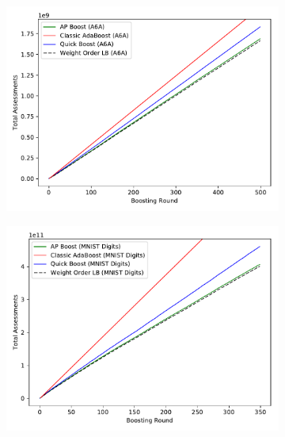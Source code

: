 \begin{figure}[ht]
\centering
\begin{subfigure}{.31\linewidth}
\includegraphics[width=\linewidth]{decisiontree/figures/result3_wolb_a6a}
\end{subfigure}
\begin{subfigure}{.31\linewidth}
\includegraphics[width=\linewidth]{decisiontree/figures/result3_wolb_mnist}
\end{subfigure}
\begin{subfigure}{.31\linewidth}

\end{subfigure}
\end{figure}
